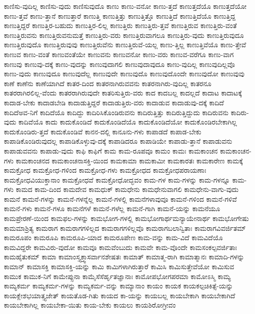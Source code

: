 {ಕಾಣಿಸು-ವುದಿಲ್ಲ
ಕಾಣಿಸು-ವುದು
ಕಾಣಿಸುವುದೊ
ಕಾಣು
ಕಾಣು-ವನೋ
ಕಾಣು-ತ್ತದೆ
ಕಾಣುತ್ತದೆಯೊ
ಕಾಣುತ್ತದೆಯೋ
ಕಾಣು-ತ್ತವೆ
ಕಾಣು-ತ್ತಾನೆ
ಕಾಣುತ್ತಾರೆ
ಕಾಣುತ್ತಿ
ಕಾಣುತ್ತಿತ್ತು
ಕಾಣುತ್ತಿತ್ತೊ
ಕಾಣುತ್ತಿದೆ
ಕಾಣುತ್ತಿದೆಯೊ
ಕಾಣುತ್ತಿದ್ದ
ಕಾಣುತ್ತಿದ್ದರೆ
ಕಾಣುತ್ತಿರ-ಬಹುದು
ಕಾಣುತ್ತಿರ-ಲಿಲ್ಲ
ಕಾಣುತ್ತಿರು
ಕಾಣುತ್ತಿರು-ತ್ತವೆ
ಕಾಣುತ್ತಿರುವ
ಕಾಣುತ್ತಿರು-ವಂತೆ
ಕಾಣುತ್ತಿರುವನು
ಕಾಣುತ್ತಿರುವನುಮತ್ತೆ
ಕಾಣುತ್ತಿರು-ವರು
ಕಾಣುತ್ತಿರುವಾಗಲೂ
ಕಾಣುತ್ತಿರು-ವುದು
ಕಾಣುತ್ತಿರುವುದೂ
ಕಾಣುತ್ತಿರುವುದೊ
ಕಾಣುತ್ತಿರುವುವು
ಕಾಣುತ್ತಿರುವೆನು
ಕಾಣುತ್ತಿರುವೆ-ಯಲ್ಲ
ಕಾಣು-ತ್ತಿಲ್ಲ
ಕಾಣುತ್ತಿವೆಯೊ
ಕಾಣು-ತ್ತೇವೆ
ಕಾಣುವ
ಕಾಣು-ವಂತೆ
ಕಾಣುವಂತೆಯೇ
ಕಾಣುವನು
ಕಾಣುವನೋ
ಕಾಣು-ವರು
ಕಾಣುವ-ವರೆಗೂ
ಕಾಣು-ವಾಗ
ಕಾಣುವು
ಕಾಣುವು-ದಕ್ಕೆ
ಕಾಣು-ವುದನ್ನು
ಕಾಣುವುದಾಗಲಿ
ಕಾಣುವುದಾವುದೂ
ಕಾಣು-ವುದಿಲ್ಲ
ಕಾಣುವುದಿಲ್ಲವೊ
ಕಾಣು-ವುದು
ಕಾಣುವುದೂ
ಕಾಣುವುದೆಲ್ಲ
ಕಾಣುವುದೇ
ಕಾಣುವುದೊ
ಕಾಣುವುದೊಂದೇ
ಕಾಣುವುದೋ
ಕಾಣುವುವು
ಕಾಣೆ
ಕಾಣೆನು
ಕಾಣೆಯಾಗಿದೆ
ಕಾತರ-ದಿಂದ
ಕಾತರನಾಗಿರುವವನು
ಕಾತರನಾಗಿರು-ವುದಿಲ್ಲ
ಕಾತರನೂ
ಕಾತರರಾಗಿರಲಿಲ್ಲ-ವೆಂದು
ಕಾತರರಾಗಿರುವುದೇ
ಕಾತರಿಸುತ್ತಿರು-ವರು
ಕಾದ
ಕಾದಬಲ್ಲ
ಕಾದಲ್ಲದೆ
ಕಾದಾಟ
ಕಾದಾಟಕ್ಕೆ
ಕಾದಾಡ-ಬೇಕು
ಕಾದಾಡಬೇಡಿ
ಕಾದಾಡುತ್ತಿದ್ದರೆ
ಕಾದಾಡುತ್ತಿರು-ವರು
ಕಾದಾಡುವ
ಕಾದಾಡುವು-ದಕ್ಕೆ
ಕಾದಿದೆ
ಕಾದಿದೆಅವ-ನಿಗೆ
ಕಾದಿದೆಯೊ
ಕಾದಿದ್ದು
ಕಾದಿರಿಸಿಕೊಂಡಿರುವನು
ಕಾದಿರುತ್ತಿತ್ತು
ಕಾದಿರುತ್ತಿದ್ದುದು
ಕಾದಿರುವನು
ಕಾದಿರು-ವುದು
ಕಾದಿವೆಯೊ
ಕಾದು
ಕಾದುಕೊಂಡಿದೆ
ಕಾದುಕೊಂಡಿದೆಯೊ
ಕಾದುಕೊಂಡಿದೆಯೋ
ಕಾದುಕೊಂಡಿರಬೇಕಾಗಿಲ್ಲ
ಕಾದುಕೊಂಡಿರು-ತ್ತದೆ
ಕಾದುಕೊಂಡಿವೆ
ಕಾನನ-ದಲ್ಲಿ
ಕಾನೂನು-ಗಳು
ಕಾಪಾಡದೆ
ಕಾಪಾಡ-ಬೇಕು
ಕಾಪಾಡಿಕೊಂಡಿರುವುದಲ್ಲ
ಕಾಪಾಡಿಕೊಳ್ಳುವು-ದಕ್ಕೆ
ಕಾಪಾಡಿದರೂ
ಕಾಪಾಡಿಯೇ
ಕಾಪಾಡು-ತ್ತಾನೆ
ಕಾಪಾಡುವನು
ಕಾಪಾಡುವವನು
ಕಾಪಾಡು-ವುದು
ಕಾಫಿ
ಕಾಫಿಗೆ
ಕಾಮ
ಕಾಮ-ರೂಪವೂ
ಕಾಮಂ
ಕಾಮಃ
ಕಾಮಕಾಂಚನ
ಕಾಮಕಾಂಚನ-ಗಳು
ಕಾಮಕಾಂಚನದ
ಕಾಮಕಾಂಚನಾಸಕ್ತಿ-ಯಿಂದ
ಕಾಮಕಾಮಾ
ಕಾಮಕಾಮೀ
ಕಾಮಕಾರತಃ
ಕಾಮಕಾರೇಣ
ಕಾಮಕ್ಕೆ
ಕಾಮಕ್ರೋಧ
ಕಾಮಕ್ರೋಧ-ಗಳಿಂದ
ಕಾಮಕ್ರೋಧ-ಗಳು
ಕಾಮಕ್ರೋಧದ
ಕಾಮಕ್ರೋಧಪರಾಯಣಾಃ
ಕಾಮಕ್ರೋಧವಿಯುಕ್ತಾನಾಂ
ಕಾಮಕ್ರೋಧವೆ
ಕಾಮಕ್ರೋಧೋದ್ಭವಂ
ಕಾಮ-ಗಳ
ಕಾಮ-ಗಳನ್ನು
ಕಾಮ-ಗಳನ್ನೂ
ಕಾಮ-ಗಳು
ಕಾಮದ
ಕಾಮ-ದಿಂದ
ಕಾಮದೇವ
ಕಾಮಧುಕ್
ಕಾಮಧೇನು
ಕಾಮಧೇನುವಾಗಲಿ
ಕಾಮಧೇನು-ವಾಗು-ವುದು
ಕಾಮನೆ
ಕಾಮನೆ-ಗಳನ್ನು
ಕಾಮನೆ-ಗಳನ್ನೆಲ್ಲ
ಕಾಮನೆ-ಗಳಲ್ಲಿ
ಕಾಮನೆಗಳಾವುವೂ
ಕಾಮನೆ-ಗಳಿಂದ
ಕಾಮನೆ-ಗಳಿವೆ
ಕಾಮನೆ-ಗಳು
ಕಾಮನೆ-ಗಳೂ
ಕಾಮನೆಗಳೆ
ಕಾಮನೆ-ಗಳೆಲ್ಲ
ಕಾಮನೆ-ಗಾಗಿ
ಕಾಮನೆ-ಯನ್ನು
ಕಾಮನೆಯೂ
ಕಾಮಪ್ರೇರಣೆ-ಯಿಂದ
ಕಾಮಫಲ-ಗಳನ್ನು
ಕಾಮಭೋಗ-ಗಳಲ್ಲಿ
ಕಾಮಭೋಗಾರ್ಥಮನ್ಯಾಯೇನಾರ್ಥ
ಕಾಮಭೋಗೇಷು
ಕಾಮಮಾಶ್ರಿತ್ಯ
ಕಾಮರಾಗ
ಕಾಮರಾಗಗಳಿಲ್ಲದ
ಕಾಮರಾಗಗಳಿಲ್ಲವೊ
ಕಾಮರಾಗಬಲಾನ್ವಿತಾಃ
ಕಾಮರಾಗವಿವರ್ಜಿತಮ್
ಕಾಮರೂಪಂ
ಕಾಮರೂಪಿ
ಕಾಮರೂಪಿ-ಯಾದ
ಕಾಮರೂಪೇಣ
ಕಾಮ-ವನ್ನು
ಕಾಮ-ವಿದೆ
ಕಾಮವಿದೆಯೊ
ಕಾಮವಿದ್ದರೇ
ಕಾಮವಿರು-ವುದೋ
ಕಾಮವೂ
ಕಾಮವೆಂಬುದು
ಕಾಮವೇ
ಕಾಮ-ವೊಂದೇ
ಕಾಮಸಂಕಲ್ಪವರ್ಜಿತಾಃ
ಕಾಮಹೈತುಕಮ್
ಕಾಮಾ
ಕಾಮಾಂಸ್ತ್ಯಕ್ತ್ವಾಸರ್ವಾನಶೇಷತಃ
ಕಾಮಾತ್
ಕಾಮಾತ್ಮ-ರಾಗಿ
ಕಾಮಾತ್ಮಾನಃ
ಕಾಮಾದಿ-ಗಳನ್ನು
ಕಾಮಾನ್
ಕಾಮಾಸಕ್ತಿ
ಕಾಮಾಸಕ್ತಿ-ಯನ್ನು
ಕಾಮಿ
ಕಾಮಿಗಳಾಗಿರುತ್ತಾರೆ
ಕಾಮಿಸಿ
ಕಾಮಿಸುತ್ತೇವೆಯೋ
ಕಾಮಿಸುವ
ಕಾಮುಕ
ಕಾಮುಕ-ನಿಗೆ
ಕಾಮೇಪ್ಸುನಾ
ಕಾಮೈಸೆಸೆರ್ಹೃತಜ್ಞಾನಾಃ
ಕಾಮೋಪಭೋಗಪರಮಾ
ಕಾಮೋಽಸ್ಮಿ
ಕಾಮ್ಯ
ಕಾಮ್ಯಕರ್ಮ
ಕಾಮ್ಯಕರ್ಮ-ಗಳನ್ನು
ಕಾಮ್ಯಕರ್ಮ-ವನ್ನು
ಕಾಮ್ಯಾನಾಂ
ಕಾಯಂ
ಕಾಯಕ
ಕಾಯಕಲ್ಪಚಿಕಿತ್ಸೆ-ಯನ್ನು
ಕಾಯಕ್ಲೇಶಭಯಾತ್ತ್ಯಜೇತ್
ಕಾಯತೊಡ-ಗಿತು
ಕಾಯದ
ಕಾ-ಯನ್ನು
ಕಾಯಬಲ್ಲ
ಕಾಯಬೇಕಾಗಿ
ಕಾಯಬೇಕಾಗಿದೆ
ಕಾಯಬೇಕಾಗಿಲ್ಲ
ಕಾಯಬೇಕಾ-ಯಿತು
ಕಾಯ-ಬೇಕು
ಕಾಯಲು
ಕಾಯಶಿರೋಗ್ರೀವಂ
}
